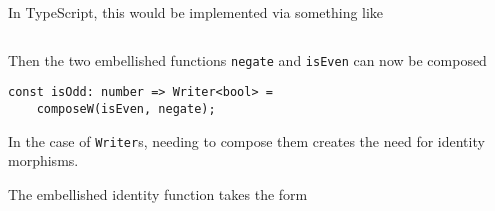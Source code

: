 \begin{remark}
    In TypeScript, this would be implemented via something like
    \inputminted{typescript}{content/code-listings/writer-compose.ts}
    
    Then the two embellished functions \texttt{negate} and \texttt{isEven} can now be composed
    
    \begin{verbatim}
const isOdd: number => Writer<bool> = 
    composeW(isEven, negate);
    \end{verbatim}
\end{remark}

\begin{remark}
    In the case of \texttt{Writer}s, needing to compose them creates the need for identity morphisms.
\end{remark}

\begin{definition}
    The embellished identity function takes the form
    \inputminted{typescript}{content/code-listings/writer-id.ts}
\end{definition}
